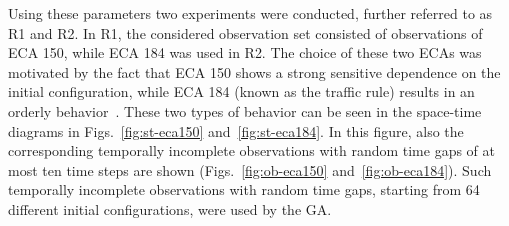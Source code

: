 Using these parameters two experiments were conducted, further referred to as R1 and R2. In R1, the considered observation set consisted of observations of ECA 150, while ECA 184 was used in R2. The choice of these two ECAs was motivated by the fact that ECA 150 shows a strong sensitive dependence on the initial configuration, while ECA 184 (known as the traffic rule) results in an orderly behavior~\cite{citeulike:9312129}. These two types of behavior can be seen in the space-time diagrams in Figs.~\ref{fig:st-eca150} and~\ref{fig:st-eca184}. In this figure, also the corresponding temporally incomplete observations with random time gaps of at most ten time steps are shown (Figs.~\ref{fig:ob-eca150} and~\ref{fig:ob-eca184}). Such temporally incomplete observations with random time gaps, starting from 64 different initial configurations, were used by the GA.

